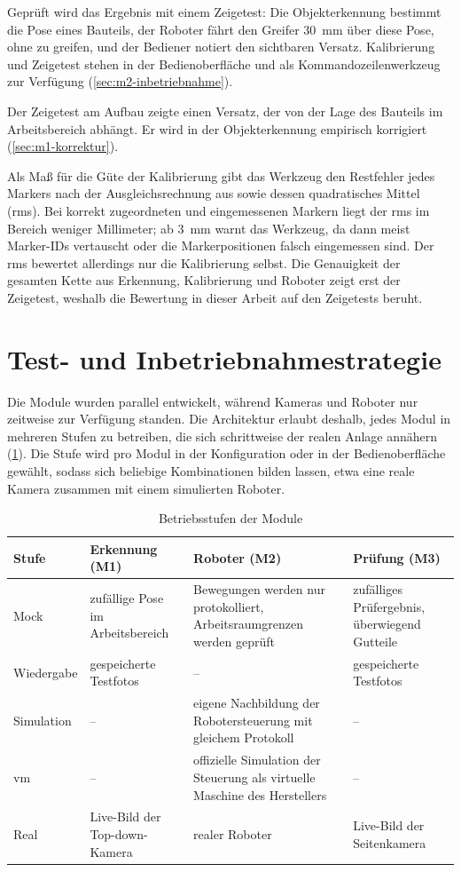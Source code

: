 Geprüft wird das Ergebnis mit einem Zeigetest: Die Objekterkennung bestimmt die Pose eines
Bauteils, der Roboter fährt den Greifer \SI{30}{\milli\metre} über diese Pose, ohne zu greifen,
und der Bediener notiert den sichtbaren Versatz. Kalibrierung und Zeigetest stehen in der
Bedienoberfläche und als Kommandozeilenwerkzeug zur Verfügung (\cref{sec:m2-inbetriebnahme}).

Der Zeigetest am Aufbau zeigte einen Versatz, der von der Lage des Bauteils im Arbeitsbereich
abhängt. Er wird in der Objekterkennung empirisch korrigiert (\cref{sec:m1-korrektur}).

Als Maß für die Güte der Kalibrierung gibt das Werkzeug den Restfehler jedes Markers nach der
Ausgleichsrechnung aus sowie dessen quadratisches Mittel (\acs{rms}). Bei korrekt zugeordneten
und eingemessenen Markern liegt der \acs{rms} im Bereich weniger Millimeter; ab
\SI{3}{\milli\metre} warnt das Werkzeug, da dann meist Marker-IDs vertauscht oder die
Markerpositionen falsch eingemessen sind. Der \acs{rms} bewertet allerdings nur die Kalibrierung
selbst. Die Genauigkeit der gesamten Kette aus Erkennung, Kalibrierung und Roboter zeigt erst der
Zeigetest, weshalb die Bewertung in dieser Arbeit auf den Zeigetests beruht.

\section{Test- und Inbetriebnahmestrategie}
\label{sec:teststrategie}

Die Module wurden parallel entwickelt, während Kameras und Roboter nur zeitweise zur
Verfügung standen. Die Architektur erlaubt deshalb, jedes Modul in mehreren Stufen zu
betreiben, die sich schrittweise der realen Anlage annähern (\cref{tab:stufen}). Die Stufe
wird pro Modul in der Konfiguration oder in der Bedienoberfläche gewählt, sodass sich
beliebige Kombinationen bilden lassen, etwa eine reale Kamera zusammen mit einem simulierten
Roboter.

\begin{table}[htbp]
  \centering
  \caption{Betriebsstufen der Module}
  \label{tab:stufen}
  \begin{tabularx}{\textwidth}{@{}l X X X@{}}
    \toprule
    Stufe & Erkennung (M1) & Roboter (M2) & Prüfung (M3) \\
    \midrule
    Mock & zufällige Pose im Arbeitsbereich & Bewegungen werden nur protokolliert, Arbeitsraumgrenzen werden geprüft & zufälliges Prüfergebnis, überwiegend Gutteile \\
    Wiedergabe & gespeicherte Testfotos & -- & gespeicherte Testfotos \\
    Simulation & -- & eigene Nachbildung der Robotersteuerung mit gleichem Protokoll & -- \\
    \ac{vm} & -- & offizielle Simulation der Steuerung als virtuelle Maschine des Herstellers & -- \\
    Real & Live-Bild der Top-down-Kamera & realer Roboter & Live-Bild der Seitenkamera \\
    \bottomrule
  \end{tabularx}
\end{table}

